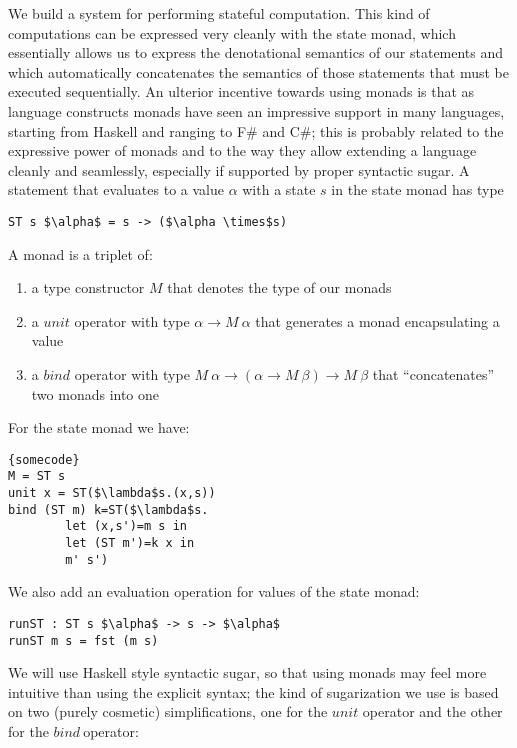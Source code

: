 \documentclass[a4paper]{article}
\begin{document}
 We build a system for performing stateful computation. This kind of computations can be expressed very cleanly with the state monad, which essentially allows us to express the denotational semantics of our statements and which automatically concatenates the semantics of those statements that must be executed sequentially. An ulterior incentive towards using monads is that as language constructs monads have seen an impressive support in many languages, starting from Haskell and ranging to F\# and C\#; this is probably related to the expressive power of monads and to the way they allow extending a language cleanly and seamlessly, especially if supported by proper syntactic sugar. A statement that evaluates to a value $\alpha $ with a state $s$ in the state monad has type

\begin{lstlisting}
ST s $\alpha$ = s -> ($\alpha \times$s)
\end{lstlisting}

A monad is a triplet of:

\begin{enumerate}
\item  a type constructor $M$ that denotes the type of our monads

\item  a $unit$ operator with type $\alpha \to M\ \alpha $ that generates a monad encapsulating a value

\item  a $bind$ operator with type $M\ \alpha \to \left(\alpha \to M\ \beta \right)\to M\ \beta $ that ``concatenates'' two monads into one
\end{enumerate}

For the state monad we have:

\begin{lstlisting}[frame=tb,mathescape]{somecode}
M = ST s
unit x = ST($\lambda$s.(x,s))
bind (ST m) k=ST($\lambda$s.
		let (x,s')=m s in
		let (ST m')=k x in 
		m' s')
\end{lstlisting}

We also add an evaluation operation for values of the state monad:

\begin{lstlisting}[frame=tb]
runST : ST s $\alpha$ -> s -> $\alpha$
runST m s = fst (m s)
\end{lstlisting}

We will use Haskell style syntactic sugar, so that using monads may feel more intuitive than using the explicit syntax; the kind of sugarization we use is based on two (purely cosmetic) simplifications, one for the $unit$ operator and the other for the $bind\ $operator:
\end{document}
